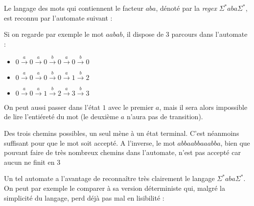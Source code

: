 \begin{example}
Le langage des mots qui contiennent le facteur $aba$, dénoté par la \textit{regex} $\Sigma^*aba\Sigma^*$, est reconnu par l'automate suivant :

\begin{figure}[!ht]
\centering
{}
\end{figure}

Si on regarde par exemple le mot $aabab$, il dispose de 3 parcours dans l'automate : 

\begin{itemize}
\item $0 \xrightarrow{a} 0 \xrightarrow{a} 0 \xrightarrow{b} 0 \xrightarrow{a} 0 \xrightarrow{b} 0$
\item $0 \xrightarrow{a} 0 \xrightarrow{a} 0 \xrightarrow{b} 0 \xrightarrow{a} 1 \xrightarrow{b} 2$
\item $0 \xrightarrow{a} 0 \xrightarrow{a} 1 \xrightarrow{b} 2 \xrightarrow{a} 3 \xrightarrow{b} 3$
\end{itemize}

On peut aussi passer dans l'état $1$ avec le premier $a$, mais il sera alors impossible de lire l'entiéreté du mot (le deuxième $a$ n'aura pas de transition).

Des trois chemins possibles, un seul mène à un état terminal. C'est néanmoins suffisant pour que le mot soit accepté. A l'inverse, le mot $abbaabbaaabba$, bien que pouvant faire de très nombreux chemins dans l'automate, n'est pas accepté car aucun ne finit en $3$
\end{example}

Un tel automate a l'avantage de reconnaître très clairement le langage $\Sigma^*aba\Sigma^*$. On peut par exemple le comparer à sa version déterministe qui, malgré la simplicité du langage, perd déjà pas mal en lisibilité :

